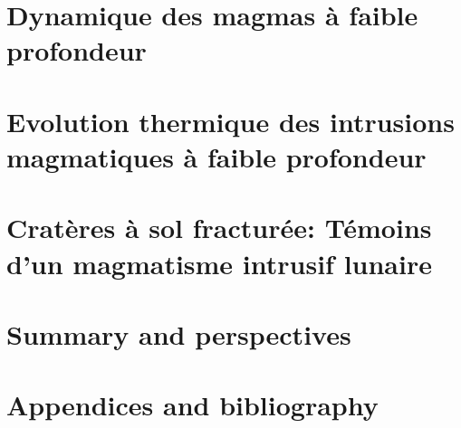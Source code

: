 \documentclass[a4paper,12pt,twoside]{ThesisStyle}
\begin{document}


\dominitoc
\setcounter{tocdepth}{2}


\cleardoublepage



\cleardoublepage

\tableofcontents

\mainmatter

\setcounter{chapter}{-1}
\pagestyle{empty}


\part{Dynamique des magmas à faible profondeur}

\pagestyle{fancy}




\part{Evolution   thermique  des   intrusions  magmatiques   à  faible
  profondeur}





\part{Cratères  à  sol  fracturée: Témoins  d'un  magmatisme  intrusif
  lunaire}




\part{Summary and perspectives}



\part{Appendices and bibliography}
\appendix






% 



\end{document}
